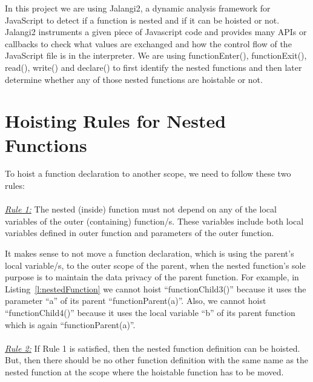 \documentclass[authoryear,preprint]{sigplanconf}
\begin{document}
In this project we are using Jalangi2, a dynamic analysis framework for JavaScript to detect if a function is nested and if it can be hoisted or not. Jalangi2 instruments a given piece of Javascript code and provides many APIs or callbacks to check what values are exchanged and how the control flow of the JavaScript file is in the interpreter. We are using functionEnter(), functionExit(), read(), write() and declare() to first identify the nested functions and then later determine whether any of those nested functions are hoistable or not.



\section{Hoisting Rules for Nested Functions}
\label{sec:hoisting_rules}
To hoist a function declaration to another scope, we need to follow these two rules:\\\\
{\underline{\textit{Rule 1:}}} The nested (inside) function must not depend on any of the local variables of the outer (containing) function/s. These variables include both local variables defined in outer function and parameters of the outer function. \\\par

It makes sense to not move a function declaration, which is using the parent's local variable/s, to the outer scope of the parent, when the nested function's sole purpose is to maintain the data privacy of the parent function. For example, in Listing~\ref{l:nestedFunction} we cannot hoist \enquote{functionChild3()} because it uses the parameter \enquote{a} of its parent \enquote{functionParent(a)}. Also, we cannot hoist \enquote{functionChild4()} because it uses the local variable \enquote{b} of its parent function which is again \enquote{functionParent(a)}. \\\\
{\underline{\textit{Rule 2:}}} If Rule 1 is satisfied, then the nested function definition can be hoisted. But, then there should be no other function definition with the same name as the nested function at the scope where the hoistable function has to be moved. \\\par


\lstset{numbers=left, numberstyle=\tiny, stepnumber=1, numbersep=5pt}
\lstset{basicstyle=\ttfamily}
\lstset{frame=tb, frame=bottomline}
\end{document}
